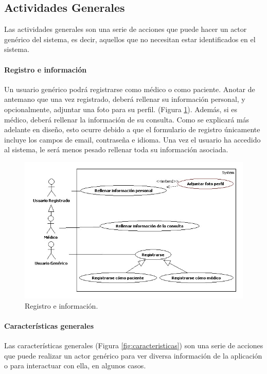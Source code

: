 \documentclass[a4paper,oneside,11pt]{book}
\begin{document}
			
	
		\subsection{Actividades Generales} %
		\label{sec:actividades_generales}
		
			Las actividades generales son una serie de acciones que puede hacer un actor genérico del sistema, es decir, aquellos que no necesitan estar identificados en el sistema.
			\paragraph{Registro e información} %
			\label{par:registro_e_informacion}
				Un usuario genérico podrá registrarse como médico o como paciente. Anotar de antemano que una vez registrado, deberá rellenar su información personal, y opcionalmente, adjuntar una foto para su perfil. (Figura \ref{fig:reg_inf}). Además, si es médico, deberá rellenar la información de su consulta. Como se explicará más adelante en diseño, esto ocurre debido a que el formulario de registro únicamente incluye los campos de email, contraseña e idioma. Una vez el usuario ha accedido al sistema, le será menos pesado rellenar toda su información asociada.
				\begin{figure}[H]
				  \centering
				    \includegraphics[width=14cm]{img/jpg/casos_uso/Registro_e_informacion.jpg}
				  \caption{Registro e información.}
				  \label{fig:reg_inf}
				\end{figure}
			
			\paragraph{Características generales} %
			\label{par:caracteristicas_generales}
				Las características generales (Figura \ref{fig:caracteristicas}) son una serie de acciones que puede realizar un actor genérico para ver diversa información de la aplicación o para interactuar con ella, en algunos casos.
							
\end{document}
